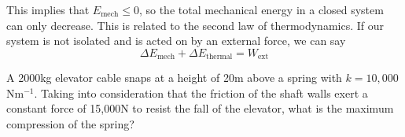 \documentclass[../classical_mechanics.tex]{subfiles}
\begin{document}
        This implies that $E_\text{mech}\leq 0$, so the total mechanical energy in a closed system can only decrease.
        This is related to the second law of thermodynamics.
        If our system is not isolated and is acted on by an external force, we can say
        \begin{equation}
            \Delta E_\text{mech} + \Delta E_\text{thermal} = W_\text{ext}
        \end{equation}
        \begin{example}
            A 2000kg elevator cable snaps at a height of 20m above a spring with $k=10,000$Nm$^{-1}$.
            Taking into consideration that the friction of the shaft walls exert a constant force of 15,000N to resist the fall of the elevator, what is the maximum compression of the spring?
        \end{example}
\end{document}
